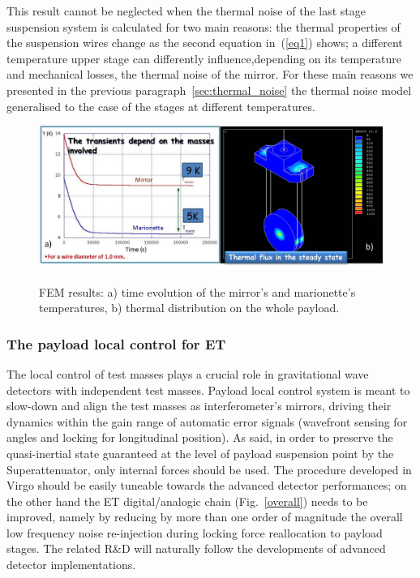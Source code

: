 This result cannot be neglected when the thermal noise of the last stage suspension system is calculated for two main reasons: the thermal properties of the suspension wires change  as the second equation in~(\ref{eq1}) shows; a different temperature upper stage can differently influence,depending on its temperature and mechanical losses, the thermal noise of the mirror. For these main reasons we presented in the previous paragraph~\ref{sec:thermal_noise} the thermal noise model generalised to the case of the stages at different temperatures.

\begin{figure}
\begin{center}
\includegraphics[scale=0.5]{Sec_Suspensions/Figures/Simul2.pdf}\\
\caption{FEM results: a) time evolution of the mirror's and marionette's temperatures, b) thermal distribution on the whole payload.}
\label{simul2}
\end{center}
\end{figure}


\FloatBarrier
\subsubsection{The payload local control for ET}
\label{sec:local_control}

The local control of test masses plays a crucial role in gravitational wave detectors with independent test masses.  
Payload local control system is meant to slow-down and align the test masses as interferometer's mirrors, driving their dynamics within the gain range of automatic error signals (wavefront sensing for angles and locking for longitudinal position). As said, in order to preserve the quasi-inertial state guaranteed at the level of payload suspension point by the Superattenuator, only internal forces should be used. 
The procedure developed in Virgo  should be easily tuneable towards the advanced detector performances; on the other hand the ET digital/analogic chain (Fig.~\ref{overall}) needs to be improved, namely by reducing by more than one order of magnitude the overall low frequency noise re-injection during locking force reallocation to  payload stages. The related R\&D will naturally follow the developments of advanced detector implementations. 

